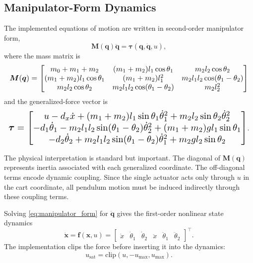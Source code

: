 \documentclass[conference]{IEEEtran}
\begin{document}
\subsection{Manipulator-Form Dynamics}
The implemented equations of motion are written in second-order manipulator form,
\begin{equation}
\bm{M}(\bm{q}) \ddot{\bm{q}} = \bm{\tau}(\bm{q}, \dot{\bm{q}}, u),
\label{eq:manipulator_form}
\end{equation}
where the mass matrix is
\begin{equation}
\resizebox{\columnwidth}{!}{$
\bm{M}(\bm{q}) =
\begin{bmatrix}
m_0 + m_1 + m_2 & (m_1+m_2)l_1\cos\theta_1 & m_2 l_2 \cos\theta_2 \\
(m_1+m_2)l_1\cos\theta_1 & (m_1+m_2)l_1^2 & m_2 l_1 l_2 \cos(\theta_1-\theta_2) \\
m_2 l_2 \cos\theta_2 & m_2 l_1 l_2 \cos(\theta_1-\theta_2) & m_2 l_2^2
\end{bmatrix}
$}
\end{equation}
and the generalized-force vector is
\begin{equation}
\resizebox{\columnwidth}{!}{$
\bm{\tau} =
\begin{bmatrix}
u - d_x \dot{x} + (m_1+m_2)l_1 \sin\theta_1 \dot{\theta}_1^2 + m_2 l_2 \sin\theta_2 \dot{\theta}_2^2 \\
- d_1 \dot{\theta}_1 - m_2 l_1 l_2 \sin(\theta_1-\theta_2)\dot{\theta}_2^2 + (m_1+m_2) g l_1 \sin\theta_1 \\
- d_2 \dot{\theta}_2 + m_2 l_1 l_2 \sin(\theta_1-\theta_2)\dot{\theta}_1^2 + m_2 g l_2 \sin\theta_2
\end{bmatrix}
$}.
\label{eq:generalized_forces}
\end{equation}

The physical interpretation is standard but important. The diagonal of $\bm{M}(\bm{q})$ represents inertia associated with each generalized coordinate. The off-diagonal terms encode dynamic coupling. Since the single actuator acts only through $u$ in the cart coordinate, all pendulum motion must be induced indirectly through these coupling terms.

Solving \eqref{eq:manipulator_form} for $\ddot{\bm{q}}$ gives the first-order nonlinear state dynamics
\begin{equation}
\dot{\bm{x}} = \bm{f}(\bm{x},u)
=
\begin{bmatrix}
\dot{x} &
\dot{\theta}_1 &
\dot{\theta}_2 &
\ddot{x} &
\ddot{\theta}_1 &
\ddot{\theta}_2
\end{bmatrix}^{\top}.
\end{equation}
The implementation clips the force before inserting it into the dynamics:
\begin{equation}
u_{\mathrm{sat}} = \mathrm{clip}(u,-u_{\max},u_{\max}).
\end{equation}
\end{document}
